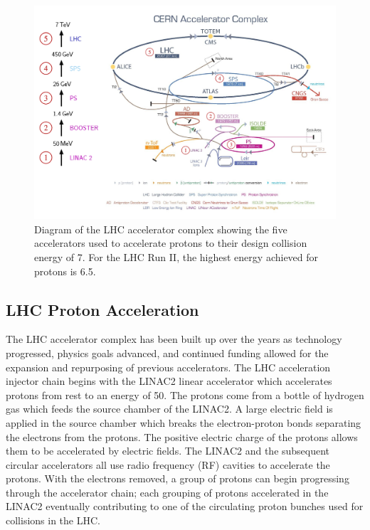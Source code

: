 \begin{figure}[htbp]
\centering
     \includegraphics[width=1.0\textwidth]{cms_and_lhc/plots/lhc_complex.png}
     \caption{
Diagram of the LHC accelerator complex showing the five accelerators used to accelerate
protons to their design collision energy of 7\TeV. For the LHC Run II, the highest energy 
achieved for protons is 6.5\TeV.
     }
     \label{fig:lhc_complex}
\end{figure}



\subsection{LHC Proton Acceleration}
The LHC accelerator complex has been built up over the years as technology progressed,
physics goals advanced, and continued funding allowed for the expansion and repurposing
of previous accelerators. The LHC acceleration injector chain begins with the LINAC2 linear
accelerator which accelerates protons from rest to an energy of 50\MeV. 
The protons come from a bottle of hydrogen gas which feeds
the source chamber of the LINAC2. A large electric field is applied in the source
chamber which breaks the electron-proton bonds separating the electrons from the protons.
The positive electric charge of the protons allows them to be accelerated by electric
fields. The LINAC2 and the subsequent circular accelerators all use radio frequency (RF)
cavities to accelerate the protons.
With the electrons removed, a group of protons can begin progressing through the accelerator
chain; each grouping of protons accelerated in the LINAC2 eventually contributing to one of the 
circulating proton bunches used for collisions in the LHC.

